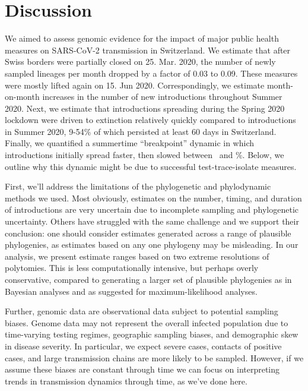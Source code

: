\documentclass[9pt,twoside,lineno]{pnas-new} %
\begin{document}
\section{Discussion}
We aimed to assess genomic evidence for the impact of major public health measures on SARS-CoV-2 transmission in Switzerland. We estimate that after Swiss borders were partially closed on 25. Mar. 2020, the number of newly sampled lineages per month dropped by a factor of 0.03 to 0.09. These measures were mostly lifted again on 15. Jun 2020. Correspondingly, we estimate month-on-month increases in the number of new introductions throughout Summer 2020. Next, we estimate that introductions spreading during the Spring 2020 lockdown were driven to extinction relatively quickly compared to introductions in Summer 2020, 9-54\% of which persisted at least 60 days in Switzerland. Finally, we quantified a summertime ``breakpoint'' dynamic in which introductions initially spread faster, then slowed between \summermaxdampingpercentmedianCHEnosampUB\ and \summermindampingpercentmedianCHEnosampUB \%. Below, we outline why this dynamic might be due to successful test-trace-isolate measures.

First, we'll address the limitations of the phylogenetic and phylodynamic methods we used. Most obviously, estimates on the number, timing, and duration of introductions are very uncertain due to incomplete sampling and phylogenetic uncertainty. Others have struggled with the same challenge \cite{Morel2021} and we support their conclusion: one should consider estimates generated across a range of plausible phylogenies, as estimates based on any one phylogeny may be misleading. In our analysis, we present estimate ranges based on two extreme resolutions of polytomies. This is less computationally intensive, but perhaps overly conservative, compared to generating a larger set of plausible phylogenies as in Bayesian analyses and as \cite{Morel2021} suggested for maximum-likelihood analyses.

Further, genomic data are observational data subject to potential sampling biases. Genome data may not represent the overall infected population due to time-varying testing regimes, geographic sampling biases, and demographic skew in disease severity. In particular, we expect severe cases, contacts of positive cases, and large transmission chains are more likely to be sampled. However, if we assume these biases are constant through time we can focus on interpreting trends in transmission dynamics through time, as we've done here. 
\end{document}
